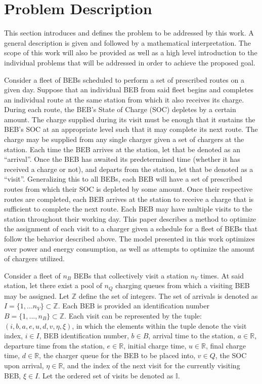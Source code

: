 \documentclass[11pt,a4paper,final]{article}
\newcommand{\visit}{(i, b, a, e, u, d, v, \eta, \xi)}
\newcommand{\I}{\mathbb{I}}                 %
\newcommand{\Iset}{I}                       %
\begin{document}
\section{Problem Description}
\label{sec:problem-description}
This section introduces and defines the problem to be addressed by this work. A general description is given and
followed by a mathematical interpretation. The scope of this work will also be provided as well as a high level
introduction to the individual problems that will be addressed in order to achieve the proposed goal.

Consider a fleet of BEBs scheduled to perform a set of prescribed routes on a given day. Suppose that an individual BEB
from said fleet begins and completes an individual route at the same station from which it also receives its charge.
During each route, the BEB's State of Charge (SOC) depletes by a certain amount. The charge supplied during its visit
must be enough that it sustains the BEB's SOC at an appropriate level such that it may complete its next route. The
charge may be supplied from any single charger given a set of chargers at the station. Each time the BEB arrives at the
station, let that be denoted as an ``arrival''. Once the BEB has awaited its predetermined time (whether it has received a
charge or not), and departs from the station, let that be denoted as a ``visit''. Generalizing this to all BEBs, each BEB
will have a set of prescribed routes from which their SOC is depleted by some amount. Once their respective routes are
completed, each BEB arrives at the station to receive a charge that is sufficient to complete the next route. Each BEB
may have multiple visits to the station throughout their working day. This paper describes a method to optimize the
assignment of each visit to a charger given a schedule for a fleet of BEBs that follow the behavior described above. The
model presented in this work optimizes over power and energy consumption, as well as attempts to optimize the amount of
chargers utilized.

Consider a fleet of \(n_B\) BEBs that collectively visit a station \(n_V\) times. At said station, let there exist a pool of
\(n_Q\) charging queues from which a visiting BEB may be assigned. Let \(\mathbb{Z}\) define the set of integers. The set of arrivals
is denoted as \(\Iset = \{ 1, ... n_V \} \subset \mathbb{Z}\). Each BEB is provided an identification number \(B = \{ 1, ..., n_B \} \subset \mathbb{Z}\).
Each visit can be represented by the tuple: \(\visit\), in which the elements within the tuple denote the visit index, \(i
\in I\), BEB identification number, \(b \in B\), arrival time to the station, \(a \in \mathbb{R}\), departure time from the station, \(e \in
\mathbb{R}\), initial charge time, \(u \in \mathbb{R}\), final charge time, \(d \in \mathbb{R}\), the charger queue for the BEB to be placed into, \(v \in Q\),
the SOC upon arrival, \(\eta \in \mathbb{R}\), and the index of the next visit for the currently visiting BEB, \(\xi \in I\). Let the ordered
set of visits be denoted as \(\I\).
\end{document}
